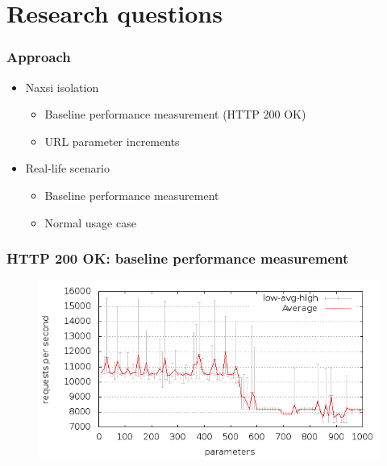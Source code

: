 \section{Research questions}


\begin{frame}[noframenumbering]
  \frametitle{Approach}
  \begin{itemize}
   \item Naxsi isolation
     \begin{itemize}
       \item Baseline performance measurement (HTTP 200 OK)
       \item URL parameter increments
     \end{itemize}
   \item Real-life scenario
     \begin{itemize}
       \item Baseline performance measurement
       \item Normal usage case
     \end{itemize}
  \end{itemize}
\end{frame}

\begin{frame}[noframenumbering]
  \frametitle{HTTP 200 OK: baseline performance measurement}
  \begin{figure}[H]
  \centering
  \includegraphics[scale=0.5] {../paper/images/results/baseline_200/output.png}
  \end{figure}
\end{frame}

